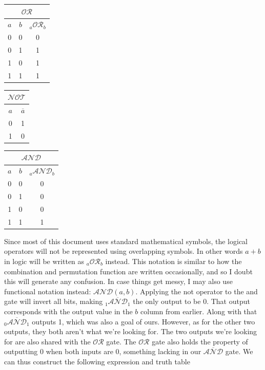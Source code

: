 \documentclass[oneside]{book}
\begin{document}
\begin{center}
\begin{tabular}{ |c|c|c| }
 \hline
 \multicolumn{3}{|c|}{$\mathcal{OR}$} \\
 \hline
 $a$ & $b$ & $_a\mathcal{OR}_b$ \\
 \hline
 0 & 0 & 0\\
 0 & 1 & 1\\
 1 & 0 & 1\\
 1 & 1 & 1\\
 \hline
\end{tabular}
\tab
\begin{tabular}{ |c|c| }
 \hline
 \multicolumn{2}{|c|}{$\mathcal{NOT}$} \\
 \hline
 $a$ & $\overline{a}$ \\
 \hline
 0 & 1\\
 1 & 0\\
 \hline
\end{tabular}
\tab
\begin{tabular}{ |c|c|c| }
 \hline
 \multicolumn{3}{|c|}{$\mathcal{AND}$} \\
 \hline
 $a$ & $b$ & $_a\mathcal{AND}_b$ \\
 \hline
 0 & 0 & 0\\
 0 & 1 & 0\\
 1 & 0 & 0\\
 1 & 1 & 1\\
 \hline
\end{tabular}
\end{center}
\tab
Since most of this document uses standard mathematical symbols, the logical operators will not be represented using overlapping symbols. In other words $a+b$ in logic will be written as $_a\mathcal{OR}_b$ instead. This notation is similar to how the combination and permutation function are written occasionally, and so I doubt this will generate any confusion. In case things get messy, I may also use functional notation instead: $\mathcal{AND}(a,b)$.
\newline
\tab
Applying the not operator to the and gate will invert all bits, making $\overline{_1\mathcal{AND}_1}$ the only output to be 0. That output corresponds with the output value in the $b$ column from earlier. Along with that $\overline{_0\mathcal{AND}_1}$ outputs 1, which was also a goal of ours. However, as for the other two outputs, they both aren't what we're looking for. The two outputs we're looking for are also shared with the $\mathcal{OR}$ gate. The $\mathcal{OR}$ gate also holds the property of outputting 0 when both inputs are 0, something lacking in our $\overline{\mathcal{AND}}$ gate. We can thus construct the following expression and truth table
\end{document}
